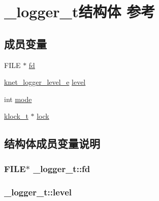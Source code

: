 \hypertarget{a00028}{}\section{\+\_\+logger\+\_\+t结构体 参考}
\label{a00028}
\subsection*{成员变量}
\begin{DoxyCompactItemize}
\item 
F\+I\+L\+E $\ast$ \hyperlink{a00028_a72330b5809799b449e034987289c7ae5_a72330b5809799b449e034987289c7ae5}{fd}
\item 
\hyperlink{a00066_a8bb61ec2ff976625d0707a81c1ccc149_a8bb61ec2ff976625d0707a81c1ccc149}{knet\+\_\+logger\+\_\+level\+\_\+e} \hyperlink{a00028_ad3e506fca31a8caa067dacbb62529655_ad3e506fca31a8caa067dacbb62529655}{level}
\item 
int \hyperlink{a00028_ab45f7a9ef9a03b4863dbd275bd4e1a2a_ab45f7a9ef9a03b4863dbd275bd4e1a2a}{mode}
\item 
\hyperlink{a00066_a4c2f62ab63ab1fd49c71e52bbda0f393_a4c2f62ab63ab1fd49c71e52bbda0f393}{klock\+\_\+t} $\ast$ \hyperlink{a00028_a516953fe87f4950b9f60825f424af222_a516953fe87f4950b9f60825f424af222}{lock}
\end{DoxyCompactItemize}


\subsection{结构体成员变量说明}
\hypertarget{a00028_a72330b5809799b449e034987289c7ae5_a72330b5809799b449e034987289c7ae5}{}
\subsubsection[{fd}]{\setlength{\rightskip}{0pt plus 5cm}F\+I\+L\+E$\ast$ \+\_\+logger\+\_\+t\+::fd}\label{a00028_a72330b5809799b449e034987289c7ae5_a72330b5809799b449e034987289c7ae5}
\hypertarget{a00028_ad3e506fca31a8caa067dacbb62529655_ad3e506fca31a8caa067dacbb62529655}{}
\subsubsection[{level}]{ \+\_\+logger\+\_\+t\+::level}\label{a00028_ad3e506fca31a8caa067dacbb62529655_ad3e506fca31a8caa067dacbb62529655}
\hypertarget{a00028_a516953fe87f4950b9f60825f424af222_a516953fe87f4950b9f60825f424af222}{}
